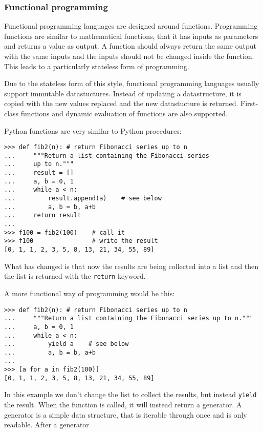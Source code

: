 \subsubsection{Functional programming}

Functional programming languages are designed around functions. Programming
functions are similar to mathematical functions, that it has inputs as
parameters and returns a value as output. A function should always return the
same output with the same inputs and the inputs should not be changed inside the
function. This leads to a particularly stateless form of programming.

Due to the stateless form of this style, functional programming languages
usually support immutable datastuctures. Instead of updating a datastructure, it
is copied with the new values replaced and the new datastucture is returned.
First-class functions and dynamic evaluation of functions are also
supported.\cite{website:persistent-struct}

Python functions are very similar to Python procedures:
\begin{verbatim}
>>> def fib2(n): # return Fibonacci series up to n
...     """Return a list containing the Fibonacci series
...     up to n."""
...     result = []
...     a, b = 0, 1
...     while a < n:
...         result.append(a)    # see below
...         a, b = b, a+b
...     return result
...
>>> f100 = fib2(100)    # call it
>>> f100                # write the result
[0, 1, 1, 2, 3, 5, 8, 13, 21, 34, 55, 89]
\end{verbatim}
What has changed is that now the results are being collected into a list and
then the list is returned with the \verb;return;
keyword.\cite[4.6. Defining Functions]{website:python-functions}

A more functional way of programming would be this:
\begin{verbatim}
>>> def fib2(n): # return Fibonacci series up to n
...     """Return a list containing the Fibonacci series up to n."""
...     a, b = 0, 1
...     while a < n:
...         yield a    # see below
...         a, b = b, a+b
... 
>>> [a for a in fib2(100)]
[0, 1, 1, 2, 3, 5, 8, 13, 21, 34, 55, 89]
\end{verbatim}
In this example we don't change the list to collect the results, but instead
\verb;yield; the result. When the function is called, it will instead return a
generator. A generator is a simple data structure, that is iterable through
once and is only readable.
After a generator 

